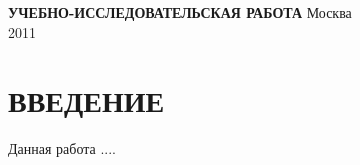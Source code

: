 \documentclass[12pt,a4paper,oneside]{article}
\begin{document}
\onehalfspacing
\pagestyle{empty} %

\begin{center}
{\bf УЧЕБНО-ИССЛЕДОВАТЕЛЬСКАЯ РАБОТА}
\vfill
Москва\\
2011
\end{center}
\sloppy
\newpage
\pagestyle{fancy} %
\fancyhf{} %
\fancyhead[C]{\thepage} %
\renewcommand{\headrulewidth}{0pt} %

\newpage
\tableofcontents %

\newpage
\section{ВВЕДЕНИЕ}


Данная работа ....
\end{document}
